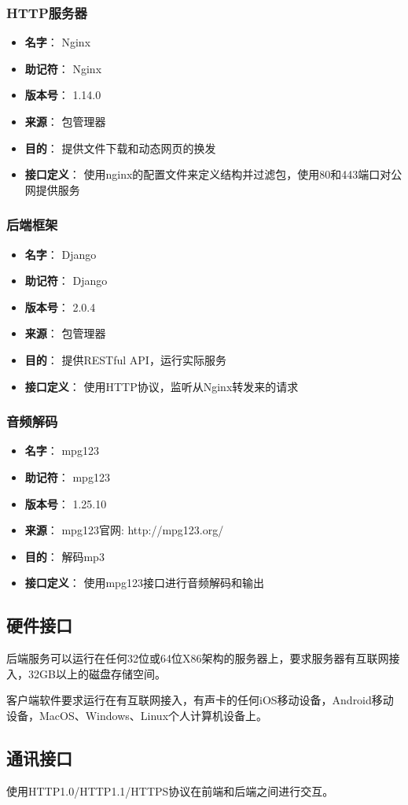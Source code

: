 \subsubsection{HTTP服务器} %
\begin{itemize}
	\item \textbf{名字}：
	Nginx
	\item \textbf{助记符}：
	Nginx
	\item \textbf{版本号}：
	1.14.0
	\item \textbf{来源}：
	包管理器
	\item \textbf{目的}：
	提供文件下载和动态网页的换发
	\item \textbf{接口定义}：
	使用nginx的配置文件来定义结构并过滤包，使用80和443端口对公网提供服务
\end{itemize}

\subsubsection{后端框架} %
\begin{itemize}
	\item \textbf{名字}：
	Django
	\item \textbf{助记符}：
	Django
	\item \textbf{版本号}：
	2.0.4
	\item \textbf{来源}：
	包管理器
	\item \textbf{目的}：
	提供RESTful API，运行实际服务
	\item \textbf{接口定义}：
	使用HTTP协议，监听从Nginx转发来的请求
\end{itemize}

\subsubsection{音频解码}
\begin{itemize}
	\item \textbf{名字}：
	mpg123
	\item \textbf{助记符}：
	mpg123
	\item \textbf{版本号}：
	1.25.10
	\item \textbf{来源}：
	mpg123官网: http://mpg123.org/
	\item \textbf{目的}：
	解码mp3
	\item \textbf{接口定义}：
	使用mpg123接口进行音频解码和输出
\end{itemize}

\subsection{硬件接口}

后端服务可以运行在任何32位或64位X86架构的服务器上，要求服务器有互联网接入，32GB以上的磁盘存储空间。

客户端软件要求运行在有互联网接入，有声卡的任何iOS移动设备，Android移动设备，MacOS、Windows、Linux个人计算机设备上。


\subsection{通讯接口}

使用HTTP1.0/HTTP1.1/HTTPS协议在前端和后端之间进行交互。

